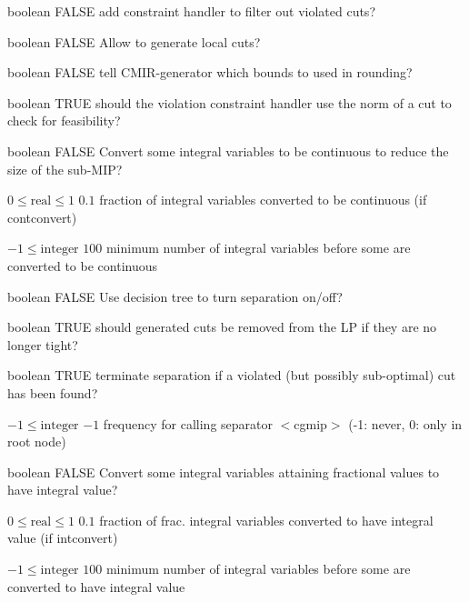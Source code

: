 %
{boolean}%
{FALSE}%
{add constraint handler to filter out violated cuts?}%
{}

%
{boolean}%
{FALSE}%
{Allow to generate local cuts?}%
{}

%
{boolean}%
{FALSE}%
{tell CMIR-generator which bounds to used in rounding?}%
{}

%
{boolean}%
{TRUE}%
{should the violation constraint handler use the norm of a cut to check for feasibility?}%
{}

%
{boolean}%
{FALSE}%
{Convert some integral variables to be continuous to reduce the size of the sub-MIP?}%
{}

%
{$0\leq\textrm{real}\leq1$}%
{$0.1$}%
{fraction of integral variables converted to be continuous (if contconvert)}%
{}

%
{$-1\leq\textrm{integer}$}%
{$100$}%
{minimum number of integral variables before some are converted to be continuous}%
{}

%
{boolean}%
{FALSE}%
{Use decision tree to turn separation on/off?}%
{}

%
{boolean}%
{TRUE}%
{should generated cuts be removed from the LP if they are no longer tight?}%
{}

%
{boolean}%
{TRUE}%
{terminate separation if a violated (but possibly sub-optimal) cut has been found?}%
{}

%
{$-1\leq\textrm{integer}$}%
{$-1$}%
{frequency for calling separator $<$cgmip$>$ (-1: never, 0: only in root node)}%
{}

%
{boolean}%
{FALSE}%
{Convert some integral variables attaining fractional values to have integral value?}%
{}

%
{$0\leq\textrm{real}\leq1$}%
{$0.1$}%
{fraction of frac. integral variables converted to have integral value (if intconvert)}%
{}

%
{$-1\leq\textrm{integer}$}%
{$100$}%
{minimum number of integral variables before some are converted to have integral value}%
{}

